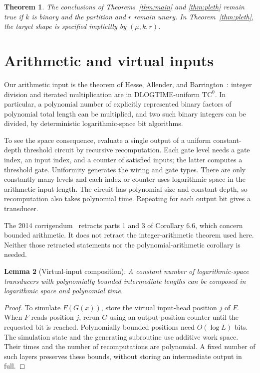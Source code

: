 \documentclass[11pt]{article}
\newtheorem{theorem}{Theorem}
\newtheorem{lemma}[theorem]{Lemma}
\newcommand{\TC}{\mathrm{TC}}
\begin{document}
\begin{theorem}\label{thm:mixed}
The conclusions of Theorems~\ref{thm:main} and \ref{thm:pleth} remain true
if $k$ is binary and the partition and $r$ remain unary. In
Theorem~\ref{thm:pleth}, the target shape is specified implicitly by
$(\mu,k,r)$.
\end{theorem}

\section{Arithmetic and virtual inputs}
Our arithmetic input is the theorem of Hesse, Allender, and
Barrington~\cite[Corollary 6.3]{HAB}: integer division and iterated
multiplication are in DLOGTIME-uniform $\TC^0$. In particular, a
polynomial number of explicitly represented binary factors of polynomial
total length can be multiplied, and two such binary integers can be
divided, by deterministic logarithmic-space bit algorithms.

To see the space consequence, evaluate a single output of a uniform
constant-depth threshold circuit by recursive recomputation. Each gate
level needs a gate index, an input index, and a counter of satisfied
inputs; the latter computes a threshold gate. Uniformity generates the
wiring and gate types. There are only constantly many levels and each
index or counter uses logarithmic space in the arithmetic input length.
The circuit has polynomial size and constant depth, so recomputation
also takes polynomial time. Repeating for each output bit gives a
transducer.

The 2014 corrigendum~\cite{HABerr} retracts parts 1 and 3 of Corollary 6.6,
which concern bounded arithmetic. It does not retract the
integer-arithmetic theorem used here. Neither those retracted statements
nor the polynomial-arithmetic corollary is needed.

\begin{lemma}[Virtual-input composition]\label{lem:compose}
A constant number of logarithmic-space transducers with polynomially
bounded intermediate lengths can be composed in logarithmic space and
polynomial time.
\end{lemma}
\begin{proof}
To simulate $F(G(x))$, store the virtual input-head position $j$ of $F$.
When $F$ reads position $j$, rerun $G$ using an output-position counter
until the requested bit is reached. Polynomially bounded positions need
$O(\log L)$ bits. The simulation state and the generating subroutine
use additive work space. Their times and the number of recomputations
are polynomial. A fixed number of such layers preserves these bounds,
without storing an intermediate output in full.
\end{proof}
\end{document}
